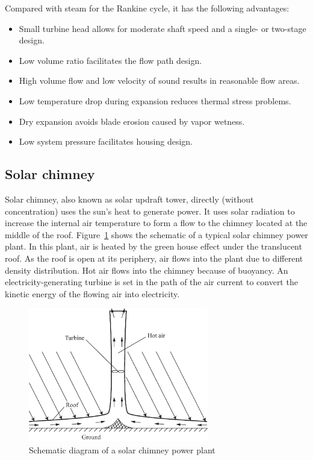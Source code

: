 
Compared with steam for the Rankine cycle, it has the following advantages:
\begin{itemize}
  \item  Small turbine head allows for moderate shaft speed and a single- or two-stage design.
    \item Low volume ratio facilitates the flow path design.
    \item High volume flow and low velocity of sound results in reasonable flow areas.
    \item Low temperature drop during expansion reduces thermal stress problems.
    \item Dry expansion avoids blade erosion caused by vapor wetness.
    \item Low system pressure facilitates housing design.
  \end{itemize}

\subsection{Solar chimney}
\label{sec:sc}
Solar chimney, also known as solar updraft tower, directly (without concentration) uses the sun's heat to generate power. It uses solar radiation to increase the internal air temperature to form a flow to the chimney located at the middle of the roof. Figure~\ref{fig:SolarChimney} shows the schematic of a typical solar chimney power plant. In this plant, air is heated by the green house effect under the translucent roof. As the roof is open at its periphery, air flows into the plant due to different density distribution. Hot air flows into the chimney because of buoyancy. An electricity-generating turbine is set in the path of the air current to convert the kinetic energy of the flowing air into electricity.

\begin{figure}[!ht]
\centering 
\includegraphics[width=0.7\textwidth]{fig/SolarChimney}
\caption{Schematic diagram of a solar chimney power plant}\label{fig:SolarChimney}
\end{figure}

